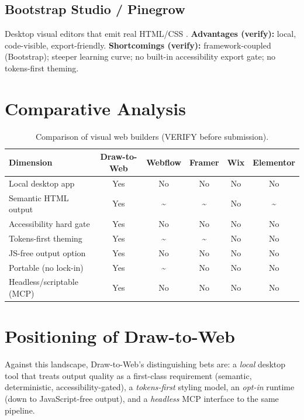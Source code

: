 \subsection{Bootstrap Studio / Pinegrow}
Desktop visual editors that emit real HTML/CSS \cite{bootstrapstudio,pinegrow}.
\textbf{Advantages (verify):} local, code-visible, export-friendly.
\textbf{Shortcomings (verify):} framework-coupled (Bootstrap); steeper learning
curve; no built-in accessibility export gate; no tokens-first theming.

\section{Comparative Analysis}
\begin{table}[H]
  \centering
  \caption{Comparison of visual web builders (VERIFY before submission).}
  \label{tab:comparison}
  \small
  \begin{tabularx}{\linewidth}{@{}l c c c c c@{}}
    \toprule
    \textbf{Dimension} & \textbf{Draw-to-Web} & \textbf{Webflow} & \textbf{Framer} & \textbf{Wix} & \textbf{Elementor} \\
    \midrule
    Local desktop app        & Yes & No  & No  & No  & No  \\
    Semantic HTML output      & Yes & \textasciitilde & \textasciitilde & No  & \textasciitilde \\
    Accessibility hard gate   & Yes & No  & No  & No  & No  \\
    Tokens-first theming      & Yes & \textasciitilde & \textasciitilde & No  & No  \\
    JS-free output option     & Yes & No  & No  & No  & No  \\
    Portable (no lock-in)     & Yes & \textasciitilde & No  & No  & No  \\
    Headless/scriptable (MCP) & Yes & No  & No  & No  & No  \\
    \bottomrule
  \end{tabularx}
\end{table}

\section{Positioning of Draw-to-Web}
Against this landscape, Draw-to-Web's distinguishing bets are: a \emph{local}
desktop tool that treats output quality as a first-class requirement (semantic,
deterministic, accessibility-gated), a \emph{tokens-first} styling model, an
\emph{opt-in} runtime (down to JavaScript-free output), and a \emph{headless}
MCP interface to the same pipeline. %

